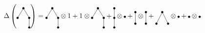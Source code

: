 \begin{example}
\[
\Delta\left(
\begin{tikzpicture}[baseline]
\foreach \x/\y/\p in {0/.5/o, -.3/0/a1, .3/0/a2, .3/-.5/b}{
    \coordinate (\p) at (\x,\y);
    \filldraw (\p) circle (0.05);
}
\draw (a1)--(o)--(a2)--(b);
\end{tikzpicture}
\right)=\begin{tikzpicture}[baseline]
\foreach \x/\y/\p in {0/.5/o, -.3/0/a1, .3/0/a2, .3/-.5/b}{
    \coordinate (\p) at (\x,\y);
    \filldraw (\p) circle (0.05);
}
\draw (a1)--(o)--(a2)--(b);
\end{tikzpicture}\otimes1+1\otimes\begin{tikzpicture}[baseline]
\foreach \x/\y/\p in {0/.5/o, -.3/0/a1, .3/0/a2, .3/-.5/b}{
    \coordinate (\p) at (\x,\y);
    \filldraw (\p) circle (0.05);
}
\draw (a1)--(o)--(a2)--(b);
\end{tikzpicture}+\begin{tikzpicture}[baseline]
\foreach \x/\y/\p in {0/.5/o, 0/0/a, 0/-.5/b}{
    \coordinate (\p) at (\x,\y);
    \filldraw (\p) circle (0.05);
}
\draw (o)--(a)--(b);
\end{tikzpicture}\otimes\begin{tikzpicture}
\filldraw (0,0) circle (0.05);
\end{tikzpicture}+\begin{tikzpicture}[baseline]
\foreach \x/\y/\p in {0/.3/o, 0/-.3/a}{
    \coordinate (\p) at (\x,\y);
    \filldraw (\p) circle (0.05);
}
\draw (o)--(a);
\end{tikzpicture}\otimes\begin{tikzpicture}[baseline]
\foreach \x/\y/\p in {0/.3/o, 0/-.3/a}{
    \coordinate (\p) at (\x,\y);
    \filldraw (\p) circle (0.05);
}
\draw (o)--(a);
\end{tikzpicture}+\begin{tikzpicture}[baseline]
\foreach \x/\y/\p in {0/.3/o, -.3/-.3/a1, .3/-.3/a2}{
    \coordinate (\p) at (\x,\y);
    \filldraw (\p) circle (0.05);
}
\draw (a1)--(o)--(a2);
\end{tikzpicture}\otimes\begin{tikzpicture}
\filldraw (0,0) circle (0.05);
\end{tikzpicture}+\begin{tikzpicture}
\filldraw (0,0) circle (0.05);
\end{tikzpicture}\otimes\begin{tikzpicture}
\filldraw (0,0) circle (0.05);
\end{tikzpicture}\;\begin{tikzpicture}[baseline]

\end{tikzpicture}\]
\end{example}
